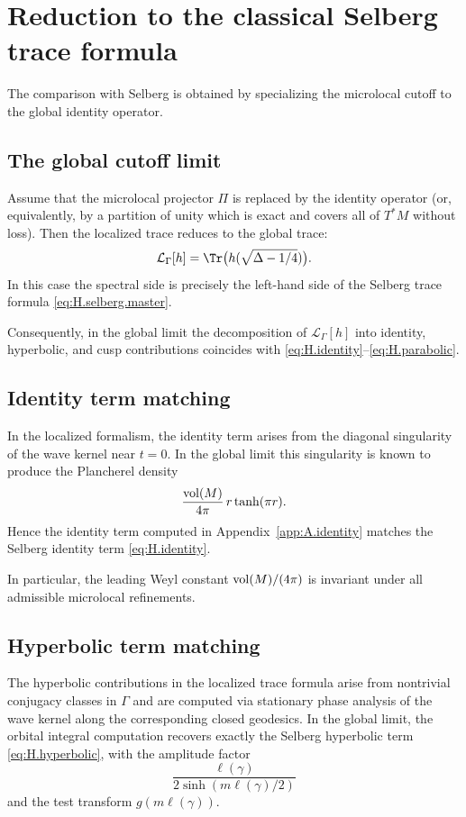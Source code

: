 \section{Reduction to the classical Selberg trace formula}
\label{sec:H.reduction}

The comparison with Selberg is obtained by specializing the microlocal cutoff to the global identity operator.

\subsection{The global cutoff limit}
\label{subsec:H.global.limit}

Assume that the microlocal projector $\Pi$ is replaced by the identity operator (or, equivalently, by a partition of
unity which is exact and covers all of $T^\ast M$ without loss).  Then the localized trace reduces to the global trace:
\[
\mathcal{L}_\Gamma[h]
=
\Tr\big(h(\sqrt{\Delta-1/4})\big).
\]
In this case the spectral side is precisely the left-hand side of the Selberg trace formula
\eqref{eq:H.selberg.master}.

Consequently, in the global limit the decomposition of $\mathcal{L}_\Gamma[h]$ into identity, hyperbolic, and cusp
contributions coincides with \eqref{eq:H.identity}--\eqref{eq:H.parabolic}.

\subsection{Identity term matching}
\label{subsec:H.identity.match}

In the localized formalism, the identity term arises from the diagonal singularity of the wave kernel near $t=0$.
In the global limit this singularity is known to produce the Plancherel density
\[
\frac{\mathop{\mathrm{vol}}\nolimits(M)}{4\pi}\,r\tanh(\pi r).
\]
Hence the identity term computed in Appendix~\ref{app:A.identity} matches the Selberg identity term
\eqref{eq:H.identity}.

In particular, the leading Weyl constant $\mathop{\mathrm{vol}}\nolimits(M)/(4\pi)$ is invariant under all admissible microlocal refinements.

\subsection{Hyperbolic term matching}
\label{subsec:H.hyperbolic.match}

The hyperbolic contributions in the localized trace formula arise from nontrivial conjugacy classes in $\Gamma$ and
are computed via stationary phase analysis of the wave kernel along the corresponding closed geodesics.
In the global limit, the orbital integral computation recovers exactly the Selberg hyperbolic term
\eqref{eq:H.hyperbolic}, with the amplitude factor
\[
\frac{\ell(\gamma)}{2\sinh(m\ell(\gamma)/2)}
\]
and the test transform $g(m\ell(\gamma))$.

